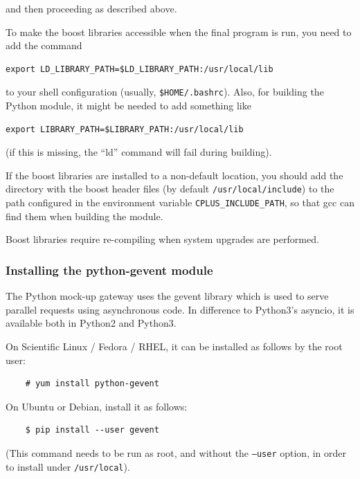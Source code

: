 \documentclass[11pt,a4paper]{report}
\begin{document}
  and then proceeding as described above.


To make the boost libraries accessible when the
final program is run, you need to add the
command

\begin{verbatim}
export LD_LIBRARY_PATH=$LD_LIBRARY_PATH:/usr/local/lib
\end{verbatim}

to your shell configuration (usually, \verb+$HOME/.bashrc+).
Also, for building the Python module, it might be needed
to add something like

\begin{verbatim}
export LIBRARY_PATH=$LIBRARY_PATH:/usr/local/lib
\end{verbatim}
(if this is missing, the ``ld'' command will fail during building).



If the boost libraries are installed to a non-default location, you
should add the directory with the boost header files (by default
\verb+/usr/local/include+) to the path configured in the environment
variable \verb+CPLUS_INCLUDE_PATH+, so that gcc can find them when
building the module.

Boost libraries require re-compiling when system upgrades are
performed.

\subsubsection{Installing the python-gevent module}
The Python mock-up gateway uses the gevent
library which is used to serve parallel requests
using asynchronous code. In difference to
Python3's asyncio, it is available both in
Python2 and Python3.

On Scientific Linux / Fedora / RHEL, it can be installed
as follows by the root user:

  \begin{verbatim}
    # yum install python-gevent
  \end{verbatim}    


On Ubuntu or Debian, install it as follows:

  \begin{verbatim}
    $ pip install --user gevent
  \end{verbatim}    

(This command needs to be run as root, and without the \texttt{--user}
  option, in order to install under \texttt{/usr/local}).
\end{document}
